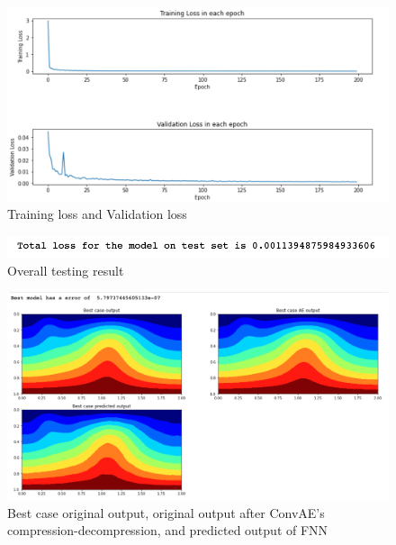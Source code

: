 \begin{figure}[H]
    \caption{Training loss and Validation loss}
    \includegraphics[scale=0.6]{Report LaTeX/figures/mantle_convection_images/larger_dataset/FNN_trainingData.png}
\end{figure}

\begin{figure}[H]
    \caption{Overall testing result}
    \includegraphics[scale=0.8]{Report LaTeX/figures/mantle_convection_images/larger_dataset/FNN_OverallTesting.png}
\end{figure}

\begin{figure}[H]
    \caption{Best case original output, original output after ConvAE's compression-decompression, and predicted output of FNN}
    \includegraphics[scale=0.5]{Report LaTeX/figures/mantle_convection_images/larger_dataset/FNN_Best.png}
\end{figure}

